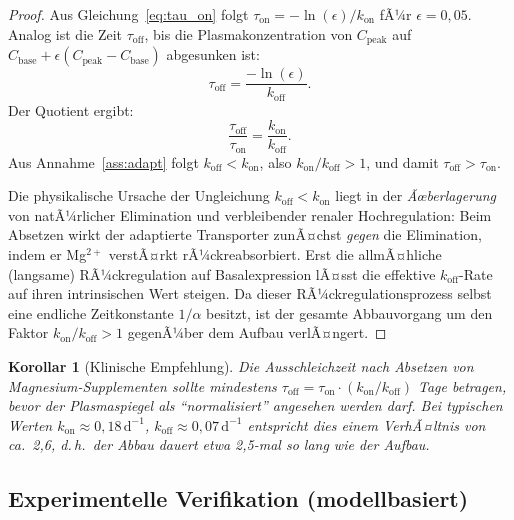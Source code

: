 ﻿\documentclass[12pt,a4paper]{article}
\theoremstyle{plain}
\newtheorem{corollary}[theorem]{Korollar}
\theoremstyle{definition}
\theoremstyle{remark}
\begin{document}
\begin{proof}
Aus Gleichung~\eqref{eq:tau_on} folgt
$\tau_\text{on} = -\ln(\epsilon)/k_\text{on}$ fÃ¼r $\epsilon = 0{,}05$.
Analog ist die Zeit $\tau_\text{off}$, bis die Plasmakonzentration von
$C_\text{peak}$ auf $C_\text{base} + \epsilon (C_\text{peak}-C_\text{base})$
abgesunken ist:
\begin{equation}
  \tau_\text{off} = \frac{-\ln(\epsilon)}{k_\text{off}}.
\end{equation}
Der Quotient ergibt:
\begin{equation}
  \frac{\tau_\text{off}}{\tau_\text{on}} = \frac{k_\text{on}}{k_\text{off}}.
  \label{eq:ratio}
\end{equation}
Aus Annahme~\ref{ass:adapt} folgt $k_\text{off} < k_\text{on}$, also
$k_\text{on}/k_\text{off} > 1$, und damit $\tau_\text{off} > \tau_\text{on}$.

\medskip
Die physikalische Ursache der Ungleichung $k_\text{off} < k_\text{on}$ liegt
in der \emph{Ãœberlagerung} von natÃ¼rlicher Elimination und verbleibender
renaler Hochregulation: Beim Absetzen wirkt der adaptierte Transporter
zunÃ¤chst \emph{gegen} die Elimination, indem er Mg$^{2+}$ verstÃ¤rkt
rÃ¼ckreabsorbiert. Erst die allmÃ¤hliche (langsame) RÃ¼ckregulation auf
Basalexpression lÃ¤sst die effektive $k_\text{off}$-Rate auf ihren
intrinsischen Wert steigen. Da dieser RÃ¼ckregulationsprozess selbst eine
endliche Zeitkonstante $1/\alpha$ besitzt, ist der gesamte Abbauvorgang um
den Faktor $k_\text{on}/k_\text{off} > 1$ gegenÃ¼ber dem Aufbau verlÃ¤ngert.
\end{proof}

\begin{corollary}[Klinische Empfehlung]
\label{cor:mg_clin}
Die Ausschleichzeit nach Absetzen von Magnesium-Supplementen sollte
mindestens $\tau_\text{off} = \tau_\text{on} \cdot (k_\text{on}/k_\text{off})$
Tage betragen, bevor der Plasmaspiegel als ``normalisiert'' angesehen werden darf.
Bei typischen Werten $k_\text{on} \approx 0{,}18\,\text{d}^{-1}$,
$k_\text{off} \approx 0{,}07\,\text{d}^{-1}$ entspricht dies einem VerhÃ¤ltnis
von ca.\ 2{,}6, d.\,h.\ der Abbau dauert etwa 2,5-mal so lang wie der Aufbau.
\end{corollary}

\subsection{Experimentelle Verifikation (modellbasiert)}
\label{ssec:mg_exp}
\end{document}
